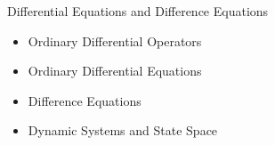 \begin{frame}
Differential Equations and Difference Equations
 \begin{itemize}
 \item Ordinary Differential Operators
 \item Ordinary Differential Equations
 \item Difference Equations
 \item Dynamic Systems and State Space
\end{itemize}
\end{frame}




